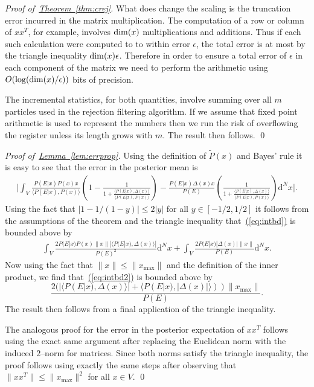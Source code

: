 \documentclass{article} %
\newenvironment{proofof}[1]{\begin{trivlist}\item[]{\flushleft\it
Proof of~#1.}}
{\qed\end{trivlist}}
\newcommand{\eq}[1]{\hyperref[eq:#1]{(\ref*{eq:#1})}}
\newcommand{\thm}[1]{\hyperref[thm:#1]{Theorem~\ref*{thm:#1}}}
\newcommand{\lem}[1]{\hyperref[lem:#1]{Lemma~\ref*{lem:#1}}}
\begin{document}
\begin{proofof}{\thm{crej}}
What does change the scaling is the truncation error incurred in the matrix multiplication.  The computation of a row or column of $xx^T$, for example, involves ${\rm dim}(x)$ multiplications and additions.  Thus if each such calculation were computed to to within error $\epsilon$, the total error is at most by the triangle inequality ${\rm dim}(x) \epsilon$.  Therefore in order to ensure a total error of $\epsilon$ in each component of the matrix we need to perform the arithmetic using $O(\log({\rm dim}(x)/\epsilon))$ bits of precision.  

The incremental statistics, for both quantities, involve summing over all $m$ particles used in the rejection filtering algorithm.  If we assume that fixed point arithmetic is used to represent the numbers then we run the risk of overflowing the register unless its length grows with $m$.  
The result then follows.
\end{proofof}

\begin{proofof}{\lem{errprop}}
Using the definition of $\tilde{P}(x)$ and Bayes' rule it is easy to see that the error in the posterior mean is
\begin{align}
\Biggr| \int_V \frac{P(E|x)P(x)x}{\langle P(E|x),P(x) \rangle}\left( 1 - \frac{1}{1+\frac{\langle P(E|x),\Delta(x)\rangle }{\langle P(E|x),P(x) \rangle}}\right) - \frac{P(E|x) \Delta(x)x}{P(E)}\left(\frac{1}{1+\frac{\langle P(E|x),\Delta(x)\rangle }{\langle P(E|x),P(x) \rangle}} \right)\mathrm{d}^Nx \Biggr|.\label{eq:intbd}
\end{align}
Using the fact that $|1-1/(1-y)| \le 2|y|$ for all $y\in [-1/2,1/2]$ it follows from the assumptions of the theorem and the triangle inequality that~\eq{intbd} is bounded above by
\begin{align}
 \int_V \frac{2P(E|x)P(x)\|x\| |\langle P(E|x),\Delta(x) \rangle|}{P(E)^2}\mathrm{d}^Nx+ \int_V\frac{2P(E|x) |\Delta(x)|\|x\|}{P(E)}\mathrm{d}^Nx.\label{eq:intbd2}
\end{align}
Now using the fact that $\|x\|\le \|x_{\max}\|$ and the definition of the inner product, we find that~\eq{intbd2} is bounded above by
\begin{equation}
\frac{2 (|\langle P(E|x),\Delta(x) \rangle| + \langle P(E|x), |\Delta(x)| \rangle))\|x_{\max}\|}{P(E)}.
\end{equation}
The  result then follows from a final application of the triangle inequality.

The analogous proof for the error in the posterior expectation of $xx^T$ follows using the exact same argument after replacing the Euclidean norm with the induced $2$--norm for matrices.  Since both norms satisfy the triangle inequality, the proof follows using exactly the same steps after observing that $\|xx^T\|\le \|x_{\max}\|^2$ for all $x\in V$.
\end{proofof}
\end{document}
